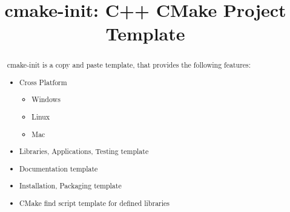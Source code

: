 \documentclass{article}
\begin{document}
\title{cmake-init: C++ CMake Project Template}

\maketitle

\begin{abstract}
\noindent
cmake-init is a copy and paste template, that provides the following features:

\begin{itemize}
  \item Cross Platform
  \begin{itemize}
    \item Windows
    \item Linux
    \item Mac
  \end{itemize}
  \item Libraries, Applications, Testing template
  \item Documentation template
  \item Installation, Packaging template
  \item CMake find script template for defined libraries
\end{itemize}

\end{abstract}

\setcounter{tocdepth}{2}
\tableofcontents

\newpage
\end{document}
